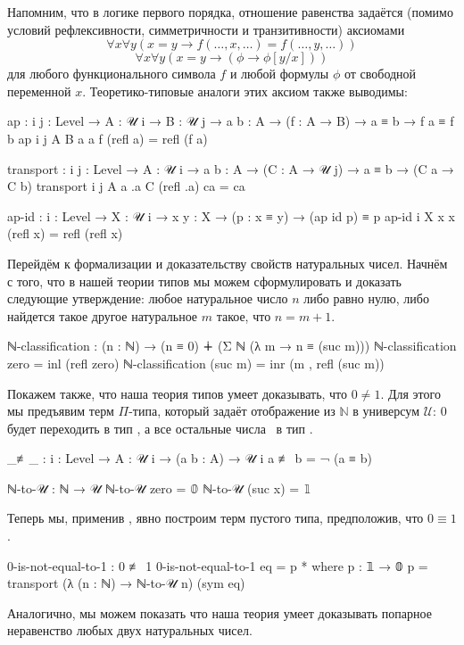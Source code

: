 \documentclass{article}[12pt]
\newcommand{\dash}{\textemdash\ }
\begin{document}
Напомним, что в логике первого порядка, отношение равенства задаётся (помимо условий
рефлексивности, симметричности и транзитивности) аксиомами
$$\forall x \forall y (x = y \rightarrow f(\dots, x, \dots) = f(\dots, y, \dots))$$
$$\forall x \forall y (x = y \rightarrow (\phi \rightarrow \phi[y/x]))$$
для любого функционального символа $f$ и любой формулы $\phi$ от свободной переменной $x$.
Теоретико-типовые аналоги этих аксиом также выводимы:
\begin{code}
ap : {i j : Level} → {A : 𝒰 i} → {B : 𝒰 j} → {a b : A} → (f : A → B)
     → a ≡ b → f a ≡ f b
ap {i} {j} {A} {B} {a} {a} f (refl a) = refl (f a)

transport : {i j : Level} → {A : 𝒰 i}  → {a b : A} → (C : A → 𝒰 j)
            → a ≡ b → (C a → C b)
transport {i} {j} {A} {a} {.a} C (refl .a) ca = ca

ap-id : {i : Level} → {X : 𝒰 i} → {x y : X}
        → (p : x ≡ y)
        → (ap id p) ≡ p
ap-id {i} {X} {x} {x} (refl x) = refl (refl x)
\end{code}

Перейдём к формализации и доказательству свойств натуральных чисел. Начнём с того, что в нашей теории типов
мы можем сформулировать и доказать следующие утверждение: любое натуральное число $n$ либо равно нулю,
либо найдется такое другое натуральное $m$ такое, что $n = m + 1$.
\begin{code}
ℕ-classification : (n : ℕ) → (n ≡ 0) ∔ (Σ ℕ (λ m → n ≡ (suc m)))
ℕ-classification zero = inl (refl zero)
ℕ-classification (suc m) = inr (m , refl (suc m))
\end{code}

Покажем также, что наша теория типов умеет доказывать, что $0 \neq 1$.
Для этого мы предъявим терм $\Pi$-типа, который задаёт отображение из $\mathbb N$ в
универсум $\mathcal U$: $0$ будет переходить в тип , а все остальные числа \dash в
тип .
\begin{code}
_≢_ : {i : Level} → {A : 𝒰 i} → (a b : A) → 𝒰 i
a ≢ b = ¬ (a ≡ b)

ℕ-to-𝒰 : ℕ → 𝒰
ℕ-to-𝒰 zero = 𝟘
ℕ-to-𝒰 (suc x) = 𝟙
\end{code}
Теперь мы, применив , явно построим терм пустого типа, предположив, что $0 \equiv 1$.
\begin{code}
0-is-not-equal-to-1 : 0 ≢ 1
0-is-not-equal-to-1 eq = p *
    where
        p : 𝟙 → 𝟘
        p = transport (λ (n : ℕ) → ℕ-to-𝒰 n) (sym eq)
\end{code}
Аналогично, мы можем показать что наша теория умеет доказывать попарное неравенство любых двух натуральных
чисел.
\end{document}
